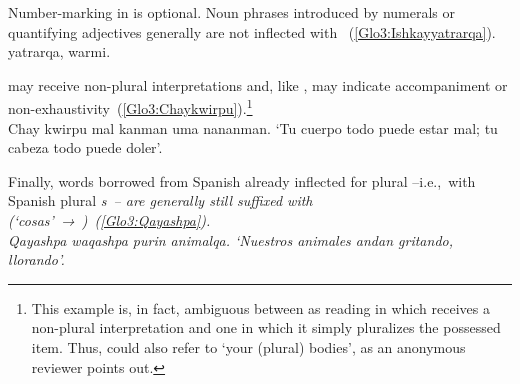 \noindent
Number-marking in \SYQ{} is optional. Noun phrases introduced by numerals or quantifying adjectives generally are not inflected with ~(\ref{Glo3:Ishkayyatrarqa}).\\

%
{ yatrarqa,  warmi.}%
{}%
{}{}%

\noindent
{} may receive non-plural interpretations and, like , may indicate accompaniment or non-exhaustivity~(\ref{Glo3:Chaykwirpu}).\footnote{This example is, in fact, ambiguous between as reading in which  receives a non-plural interpretation and one in which it simply pluralizes the possessed item. Thus,  could also refer to ‘your (plural) bodies’, as an anonymous reviewer points out.}\\

%
{Chay kwirpu mal kanman uma nananman.}%
{}%
{‘Tu cuerpo todo puede estar mal; tu cabeza todo puede doler’.}%
{}{}%

\noindent
Finally, words borrowed from Spanish already inflected for plural --i.e.,~with Spanish plural \it{s}~-- are generally still suffixed with  (‘cosas’~→~)~(\ref{Glo3:Qayashpa}).\\

%
{Qayashpa waqashpa purin animalqa.}%
{}%
{‘Nuestros animales andan gritando, llorando’.}%
{}{}%

